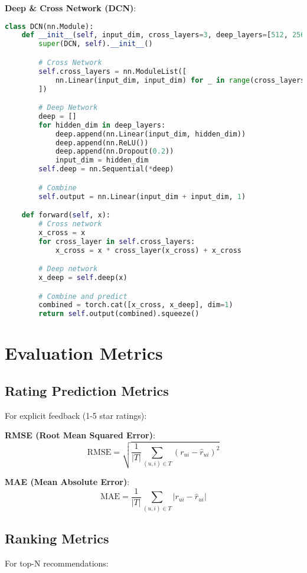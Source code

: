 \documentclass[10pt]{article}
\begin{document}
\textbf{Deep \& Cross Network (DCN)}:
\begin{lstlisting}[language=Python]
class DCN(nn.Module):
    def __init__(self, input_dim, cross_layers=3, deep_layers=[512, 256, 128]):
        super(DCN, self).__init__()

        # Cross Network
        self.cross_layers = nn.ModuleList([
            nn.Linear(input_dim, input_dim) for _ in range(cross_layers)
        ])

        # Deep Network
        deep = []
        for hidden_dim in deep_layers:
            deep.append(nn.Linear(input_dim, hidden_dim))
            deep.append(nn.ReLU())
            deep.append(nn.Dropout(0.2))
            input_dim = hidden_dim
        self.deep = nn.Sequential(*deep)

        # Combine
        self.output = nn.Linear(input_dim + input_dim, 1)

    def forward(self, x):
        # Cross network
        x_cross = x
        for cross_layer in self.cross_layers:
            x_cross = x * cross_layer(x_cross) + x_cross

        # Deep network
        x_deep = self.deep(x)

        # Combine and predict
        combined = torch.cat([x_cross, x_deep], dim=1)
        return self.output(combined).squeeze()
\end{lstlisting}

\section{Evaluation Metrics}

\subsection{Rating Prediction Metrics}

For explicit feedback (1-5 star ratings):

\textbf{RMSE (Root Mean Squared Error)}:
\[
\text{RMSE} = \sqrt{\frac{1}{|T|} \sum_{(u,i) \in T} (r_{ui} - \hat{r}_{ui})^2}
\]

\textbf{MAE (Mean Absolute Error)}:
\[
\text{MAE} = \frac{1}{|T|} \sum_{(u,i) \in T} |r_{ui} - \hat{r}_{ui}|
\]

\subsection{Ranking Metrics}

For top-N recommendations:
\end{document}
